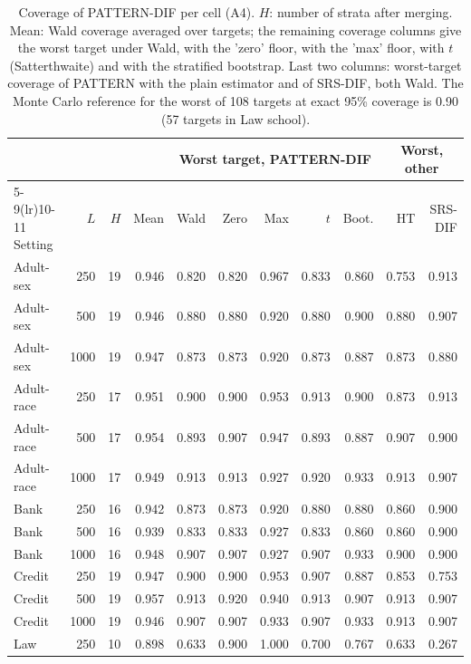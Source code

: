 \documentclass[pdflatex,sn-mathphys-num,iicol]{sn-jnl}
\theoremstyle{thmstyleone}
\theoremstyle{thmstyletwo}
\theoremstyle{thmstylethree}
\begin{document}
\begin{table}[t]
\centering\scriptsize
\caption{Coverage of PATTERN-DIF per cell (A4). $H$: number of strata after merging. Mean: Wald coverage averaged over targets; the remaining coverage columns give the worst target under Wald, with the 'zero' floor, with the 'max' floor, with $t$ (Satterthwaite) and with the stratified bootstrap. Last two columns: worst-target coverage of PATTERN with the plain estimator and of SRS-DIF, both Wald. The Monte Carlo reference for the worst of 108 targets at exact 95\% coverage is 0.90 (57 targets in Law school).}
\label{tab:abl-app-cov}
\setlength{\tabcolsep}{4pt}
\begin{tabular}{lrrrrrrrrrr}
\toprule
 & & & & \multicolumn{5}{c}{Worst target, PATTERN-DIF} & \multicolumn{2}{c}{Worst, other} \\
\cmidrule(lr){5-9}\cmidrule(lr){10-11}
Setting & $L$ & $H$ & Mean & Wald & Zero & Max & $t$ & Boot. & HT & SRS-DIF \\
\midrule
Adult-sex & 250 & 19 & 0.946 & 0.820 & 0.820 & 0.967 & 0.833 & 0.860 & 0.753 & 0.913 \\
Adult-sex & 500 & 19 & 0.946 & 0.880 & 0.880 & 0.920 & 0.880 & 0.900 & 0.880 & 0.907 \\
Adult-sex & 1000 & 19 & 0.947 & 0.873 & 0.873 & 0.920 & 0.873 & 0.887 & 0.873 & 0.880 \\
Adult-race & 250 & 17 & 0.951 & 0.900 & 0.900 & 0.953 & 0.913 & 0.900 & 0.873 & 0.913 \\
Adult-race & 500 & 17 & 0.954 & 0.893 & 0.907 & 0.947 & 0.893 & 0.887 & 0.907 & 0.900 \\
Adult-race & 1000 & 17 & 0.949 & 0.913 & 0.913 & 0.927 & 0.920 & 0.933 & 0.913 & 0.907 \\
Bank & 250 & 16 & 0.942 & 0.873 & 0.873 & 0.920 & 0.880 & 0.880 & 0.860 & 0.900 \\
Bank & 500 & 16 & 0.939 & 0.833 & 0.833 & 0.927 & 0.833 & 0.860 & 0.860 & 0.900 \\
Bank & 1000 & 16 & 0.948 & 0.907 & 0.907 & 0.927 & 0.907 & 0.933 & 0.900 & 0.900 \\
Credit & 250 & 19 & 0.947 & 0.900 & 0.900 & 0.953 & 0.907 & 0.887 & 0.853 & 0.753 \\
Credit & 500 & 19 & 0.957 & 0.913 & 0.920 & 0.940 & 0.913 & 0.907 & 0.913 & 0.907 \\
Credit & 1000 & 19 & 0.946 & 0.907 & 0.907 & 0.933 & 0.907 & 0.933 & 0.913 & 0.907 \\
Law & 250 & 10 & 0.898 & 0.633 & 0.900 & 1.000 & 0.700 & 0.767 & 0.633 & 0.267 \\

\end{tabular}
\end{table}
\end{document}
